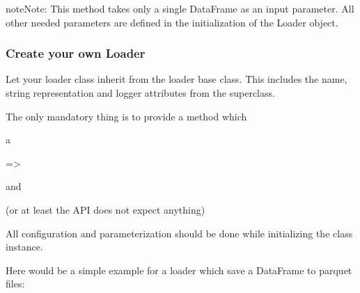 \documentclass[a4paper,10pt, twoside,english]{sphinxmanual}
\begin{document}
\begin{fulllineitems}
\begin{fulllineitems}
\begin{quote}
\begin{description}
\end{description}\end{quote}

\begin{sphinxadmonition}{note}{Note:}
This method takes only a single DataFrame as an input parameter. All other needed
parameters are defined in the initialization of the Loader object.
\end{sphinxadmonition}

\end{fulllineitems}


\end{fulllineitems}



\subsubsection{Create your own Loader}
\label{\detokenize{base_classes/loader:create-your-own-loader}}\label{\detokenize{base_classes/loader:custom-loader}}
Let your loader class inherit from the loader base class.
This includes the name, string representation and logger attributes from the superclass.

\begin{DUlineblock}{0em}
\item[] The only mandatory thing is to provide a  method which
\item[]  a
\item[] =\textgreater{} 
\item[] and 
\item[]  (or at least the API does not expect anything)
\end{DUlineblock}

All configuration and parameterization should be done while initializing the class instance.

Here would be a simple example for a loader which save a DataFrame to parquet files:
\end{document}

